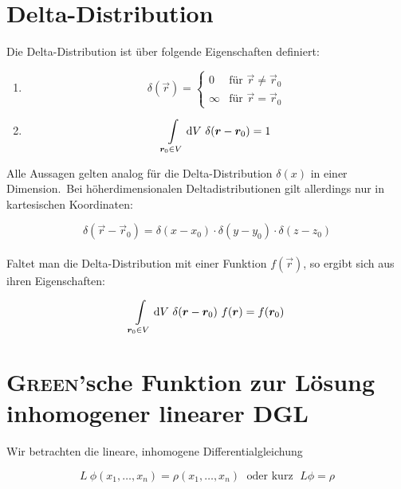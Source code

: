 \section{Delta-Distribution}

Die Delta-Distribution ist über folgende Eigenschaften definiert:

\begin{enumerate}
	\item
	\begin{equation*}
	\delta(\vec{r}) = \begin{cases}
	0 & \text{für }\vec{r}\neq\vec{r}_0\\
	\infty & \text{für } \vec{r} = \vec{r}_0
	\end{cases}
	\end{equation*}
	
	\item
	\begin{equation*}
	\int\limits_{\vec{r}_0\in V}\d V \ \delta({\vec{r}-\vec{r}_0}) = 1
	\end{equation*}
\end{enumerate}

Alle Aussagen gelten analog für die Delta-Distribution $\delta(x)$ in einer Dimension.\
Bei höherdimensionalen Deltadistributionen gilt allerdings nur in kartesischen Koordinaten:

\begin{equation*}
\delta(\vec{r} - \vec{r}_0) = \delta(x-x_0)\cdot\delta(y-y_0)\cdot\delta(z-z_0)
\end{equation*}
\ \\
Faltet man die Delta-Distribution mit einer Funktion $f(\vec{r})$, so ergibt sich aus ihren Eigenschaften:

\begin{equation*}
\int\limits_{\vec{r}_0\in V}\d V \ \delta({\vec{r}-\vec{r}_0}) \ f(\vec{r}) = f(\vec{r}_0)
\end{equation*}

\section{\textsc{Green}'sche Funktion zur Lösung inhomogener linearer DGL}

Wir betrachten die lineare, inhomogene Differentialgleichung

\begin{equation*}
L \ \phi (x_1,\dotsc,x_n) = \rho (x_1,\dotsc,x_n) \; \text{ oder kurz } \; L\phi = \rho
\end{equation*}

